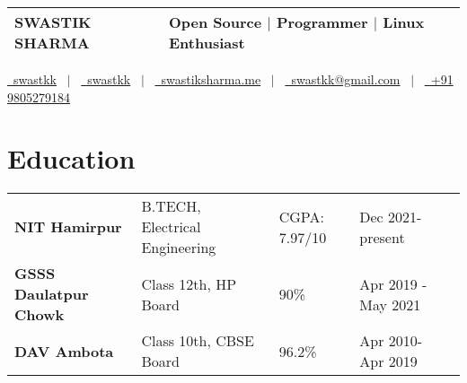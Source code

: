 \documentclass[legalpaper,11pt]{article}
\begin{document}
\pagestyle{empty} 



\begin{tabularx}{\linewidth}{@{} l X @{}}
\Huge{SWASTIK SHARMA} & \small{Open Source $|$ Programmer $|$ Linux Enthusiast} \\[6pt]
\hline %
\end{tabularx}

\begin{flushleft}
\href{https://github.com/swastkk}{\raisebox{-0.05\height}\faGithub\ swastkk} \ $|$ \ 
\href{https://linkedin.com/in/swastkk}{\raisebox{-0.05\height}\faLinkedin\ swastkk} \ $|$ \ 
\href{https://swastiksharma.me}{\raisebox{-0.05\height}\faGlobe \ swastiksharma.me} \ $|$ \ 
\href{mailto:swastkk@gmail.com}{\raisebox{-0.05\height}\faEnvelope \ swastkk@gmail.com} \ $|$ \ 
\href{tel:+91 9805279184}{\raisebox{-0.05\height}\faMobile \ +91 9805279184} \\
\end{flushleft}


\section{Education}

\begin{tabular}{lllll}
\textbf{NIT Hamirpur}         & B.TECH, Electrical Engineering & CGPA: 7.97/10 & Dec 2021- present   &  \\
\textbf{GSSS Daulatpur Chowk} & Class 12th, HP Board           & 90\%          & Apr 2019 - May 2021 &  \\
\textbf{DAV Ambota}           & Class 10th, CBSE Board         & 96.2\%        & Apr 2010- Apr 2019  &  \\
                                  
\end{tabular}
\end{document}
